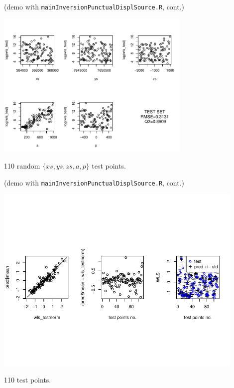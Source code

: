 \begin{frame}{}
\small (demo with \texttt{mainInversionPunctualDisplSource.R}, cont.)
\begin{center}
\includegraphics[width=0.7\textwidth]{4_optimization/figures/misfit_test_set} 
\end{center}
{\tiny 110 random $\{xs,ys,zs,a,p\}$ test points.}\\
\end{frame}

\begin{frame}{}
\small (demo with \texttt{mainInversionPunctualDisplSource.R}, cont.)
\begin{center}
\includegraphics[width=0.9\textwidth]{4_optimization/figures/misfit_test_set_2} 
\end{center}
{\tiny 110 test points.}\\
\end{frame}

